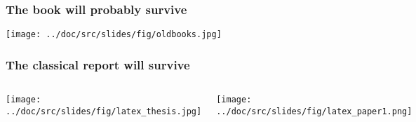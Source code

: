 \documentclass{beamer}
\begin{document}
\begin{frame}
\frametitle{The book will probably survive}

\vspace{6mm}

\centerline{\texttt{[image: ../doc/src/slides/fig/oldbooks.jpg]}}

\vspace{6mm}
\end{frame}

\begin{frame}
\frametitle{The classical report will survive}

\begin{columns}
\vspace{6mm}

\centerline{\texttt{[image: ../doc/src/slides/fig/latex\_thesis.jpg]}}

\vspace{6mm}


\vspace{6mm}

\centerline{\texttt{[image: ../doc/src/slides/fig/latex\_paper1.png]}}

\vspace{6mm}


\end{columns}
\end{frame}
\end{document}
